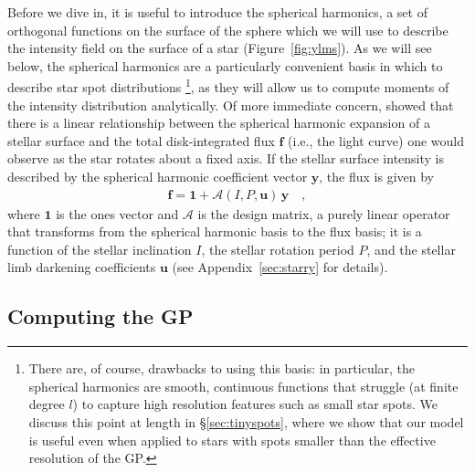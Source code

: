 \documentclass[modern]{aastex62}
\begin{document}
Before we dive in, it is useful to introduce the spherical harmonics,
a set of orthogonal functions on the surface of the sphere which we will use
to describe the intensity field on the surface of a star
(Figure~\ref{fig:ylms}). As we will see below,
the spherical harmonics are a particularly convenient basis in which to
describe star spot distributions%
\footnote{There are, of course, drawbacks to using this basis:
    in particular, the spherical harmonics are smooth, continuous functions that
    struggle (at finite degree $l$) to capture high resolution features such as
    small star spots. We discuss this point at length in \S\ref{sec:tinyspots},
    where we show that our model is useful even when applied to stars with spots
    smaller than the effective resolution of the GP.}, as they will allow us to compute
moments of the intensity distribution analytically. Of more immediate concern,
\citet{Luger2019} showed that there is a linear relationship between the
spherical harmonic expansion of a stellar surface and the total disk-integrated
flux $\mathbf{f}$ (i.e., the light curve)
one would observe as the star rotates about a fixed axis.
If the stellar surface intensity is described by the spherical harmonic
coefficient vector $\mathbf{y}$, the flux is given by
%
\begin{align}
    \label{eq:fAy}
    \mathbf{f} = \mathbf{1} + \pmb{\mathcal{A}}(I, P, \mathbf{u}) \, \mathbf{y}
    \quad,
\end{align}
%
where $\mathbf{1}$ is the ones vector and
$\pmb{\mathcal{A}}$ is the \starry
design matrix, a purely linear operator that transforms from the spherical
harmonic basis to the flux basis; it is
a function of the stellar inclination $I$, the stellar
rotation period $P$, and the stellar limb darkening coefficients $\mathbf{u}$
(see Appendix~\ref{sec:starry} for details).

\subsection{Computing the GP}
\label{sec:gp}
%
\end{document}
